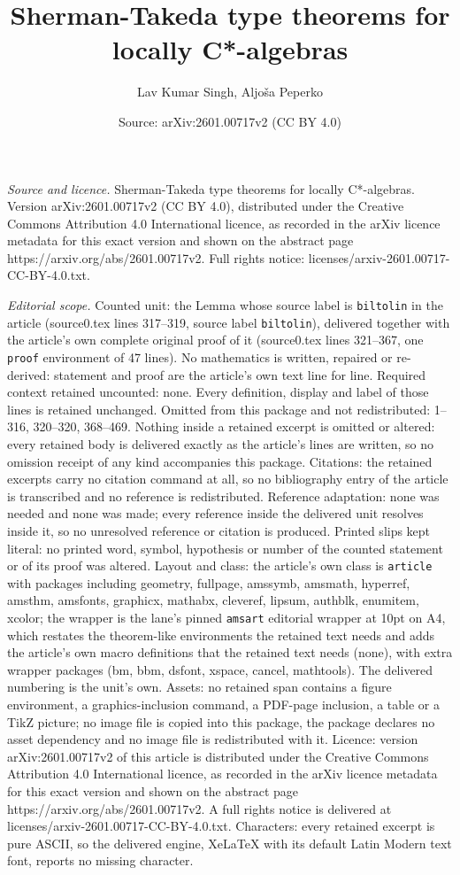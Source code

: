 \documentclass[10pt,a4paper]{amsart}
\title[Sherman-Takeda type theorems for locally C*-algebras]{Sherman-Takeda type theorems for locally C*-algebras}
\author{Lav Kumar Singh, Aljo\v{s}a Peperko}
\date{Source: arXiv:2601.00717v2 (CC BY 4.0)}
\begin{document}
\maketitle

\noindent\emph{Source and licence.} Sherman-Takeda type theorems for locally C*-algebras. Version arXiv:2601.00717v2 (CC BY 4.0), distributed under the Creative Commons Attribution 4.0 International licence, as recorded in the arXiv licence metadata for this exact version and shown on the abstract page https://arxiv.org/abs/2601.00717v2. Full rights notice: licenses/arxiv-2601.00717-CC-BY-4.0.txt.\par\smallskip

\noindent\textit{Editorial scope.} Counted unit: the Lemma whose source label is \texttt{biltolin} in the article (source0.tex lines 317--319, source label \texttt{biltolin}), delivered together with the article's own complete original proof of it (source0.tex lines 321--367, one \texttt{proof} environment of 47 lines). No mathematics is written, repaired or re-derived: statement and proof are the article's own text line for line. Required context retained uncounted: none. Every definition, display and label of those lines is retained unchanged. Omitted from this package and not redistributed: 1--316, 320--320, 368--469. Nothing inside a retained excerpt is omitted or altered: every retained body is delivered exactly as the article's lines are written, so no omission receipt of any kind accompanies this package. Citations: the retained excerpts carry no citation command at all, so no bibliography entry of the article is transcribed and no reference is redistributed. Reference adaptation: none was needed and none was made; every reference inside the delivered unit resolves inside it, so no unresolved reference or citation is produced. Printed slips kept literal: no printed word, symbol, hypothesis or number of the counted statement or of its proof was altered. Layout and class: the article's own class is \texttt{article} with packages including geometry, fullpage, amssymb, amsmath, hyperref, amsthm, amsfonts, graphicx, mathabx, cleveref, lipsum, authblk, enumitem, xcolor; the wrapper is the lane's pinned \texttt{amsart} editorial wrapper at 10pt on A4, which restates the theorem-like environments the retained text needs and adds the article's own macro definitions that the retained text needs (none), with extra wrapper packages (bm, bbm, dsfont, xspace, cancel, mathtools). The delivered numbering is the unit's own. Assets: no retained span contains a figure environment, a graphics-inclusion command, a PDF-page inclusion, a table or a TikZ picture; no image file is copied into this package, the package declares no asset dependency and no image file is redistributed with it. Licence: version arXiv:2601.00717v2 of this article is distributed under the Creative Commons Attribution 4.0 International licence, as recorded in the arXiv licence metadata for this exact version and shown on the abstract page https://arxiv.org/abs/2601.00717v2. A full rights notice is delivered at licenses/arxiv-2601.00717-CC-BY-4.0.txt. Characters: every retained excerpt is pure ASCII, so the delivered engine, XeLaTeX with its default Latin Modern text font, reports no missing character.
\end{document}
